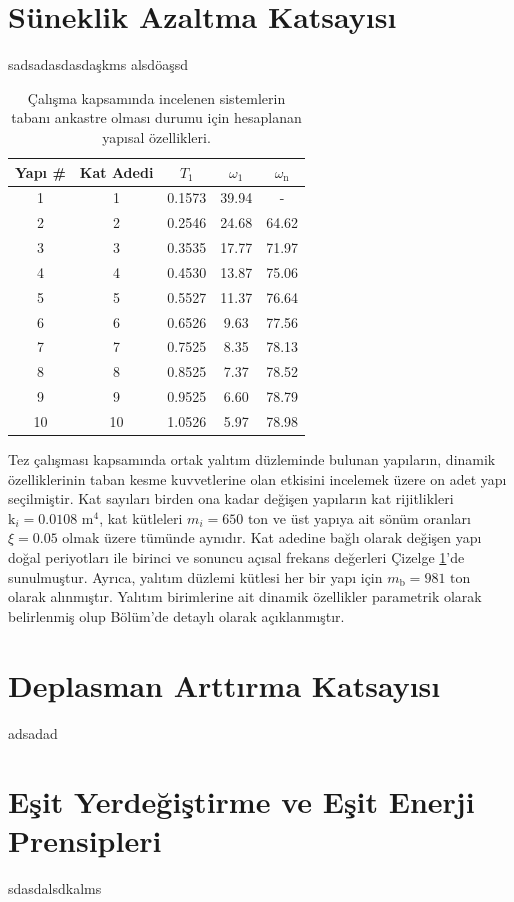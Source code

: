 \section{Süneklik Azaltma Katsayısı}

sadsadasdasdaşkms alsdöaşsd 

\begin{table}[h]
\centering{}\caption{\label{structures2}Çalışma kapsamında incelenen sistemlerin tabanı
ankastre olması durumu için hesaplanan yapısal özellikleri.}
\begin{tabular}{ccccc}
\hline 
Yapı \#  & Kat Adedi  & $T_{1}$  & $\omega_{1}$  & $\omega_{\text{n}}$ \tabularnewline
\hline 
1  & 1  & 0.1573  & 39.94  & - \tabularnewline
2  & 2  & 0.2546  & 24.68  & 64.62 \tabularnewline
3  & 3  & 0.3535  & 17.77  & 71.97 \tabularnewline
4  & 4  & 0.4530  & 13.87  & 75.06 \tabularnewline
5  & 5  & 0.5527  & 11.37  & 76.64 \tabularnewline
6  & 6  & 0.6526  & 9.63  & 77.56 \tabularnewline
7  & 7  & 0.7525  & 8.35  & 78.13 \tabularnewline
8  & 8  & 0.8525  & 7.37  & 78.52 \tabularnewline
9  & 9  & 0.9525  & 6.60  & 78.79 \tabularnewline
10  & 10  & 1.0526  & 5.97  & 78.98 \tabularnewline
\hline 
\end{tabular}
\end{table}

Tez çalışması kapsamında ortak yalıtım düzleminde bulunan yapıların,
dinamik özelliklerinin taban kesme kuvvetlerine olan etkisini incelemek
üzere on adet yapı seçilmiştir. Kat sayıları birden ona kadar değişen
yapıların kat rijitlikleri $\text{k}_{i}=0.0108\text{ m}^{4}$, kat
kütleleri $m_{i}=650\text{ ton}$ ve üst yapıya ait sönüm oranları
$\xi=0.05$ olmak üzere tümünde aynıdır. Kat adedine bağlı olarak
değişen yapı doğal periyotları ile birinci ve sonuncu açısal frekans
değerleri Çizelge \ref{structures2}'de sunulmuştur. Ayrıca, yalıtım
düzlemi kütlesi her bir yapı için $m_{\text{b}}=981\text{ ton}$ olarak
alınmıştır. Yalıtım birimlerine ait dinamik özellikler parametrik
olarak belirlenmiş olup Bölüm'de detaylı olarak açıklanmıştır.

\section{Deplasman Arttırma Katsayısı}

adsadad

\section{Eşit Yerdeğiştirme ve Eşit Enerji Prensipleri}

sdasdalsdkalms
